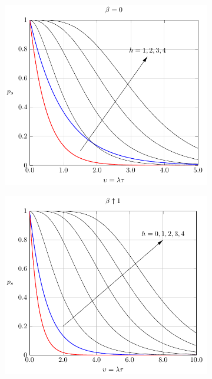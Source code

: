 \begin{figure}[htb]
    \centering
    \if{}
        \begin{subfigure}{.45\textwidth}
          \centering
            \includegraphics[width=\columnwidth]{Figures/Ch5_HI_0.pdf}
        \label{fig:HI_0}
        \end{subfigure}%
        \begin{subfigure}{.05\textwidth}
        \hspace{.05\textwidth}
        \end{subfigure}%
        \begin{subfigure}{.45\textwidth}
          \centering
            \includegraphics[width=\columnwidth]{Figures/Ch5_HI_1.pdf}

\end{subfigure}
\end{figure}
